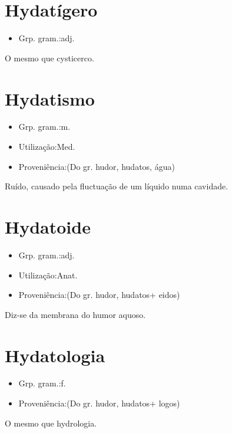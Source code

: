 \documentclass{article}
\begin{document}
\section{Hydatígero}
\begin{itemize}
\item {Grp. gram.:adj.}
\end{itemize}
O mesmo que \textunderscore cysticerco\textunderscore .
\section{Hydatismo}
\begin{itemize}
\item {Grp. gram.:m.}
\end{itemize}
\begin{itemize}
\item {Utilização:Med.}
\end{itemize}
\begin{itemize}
\item {Proveniência:(Do gr. \textunderscore hudor\textunderscore , \textunderscore hudatos\textunderscore , água)}
\end{itemize}
Ruído, causado pela fluctuação de um líquido numa cavidade.
\section{Hydatoide}
\begin{itemize}
\item {Grp. gram.:adj.}
\end{itemize}
\begin{itemize}
\item {Utilização:Anat.}
\end{itemize}
\begin{itemize}
\item {Proveniência:(Do gr. \textunderscore hudor\textunderscore , \textunderscore hudatos\textunderscore  + \textunderscore eidos\textunderscore )}
\end{itemize}
Diz-se da membrana do humor aquoso.
\section{Hydatologia}
\begin{itemize}
\item {Grp. gram.:f.}
\end{itemize}
\begin{itemize}
\item {Proveniência:(Do gr. \textunderscore hudor\textunderscore , \textunderscore hudatos\textunderscore  + \textunderscore logos\textunderscore )}
\end{itemize}
O mesmo que \textunderscore hydrologia\textunderscore .
\end{document}
